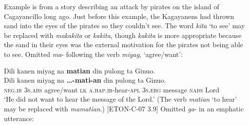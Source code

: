 Example  is from a story describing an attack by pirates on the island of Cagayancillo long ago. Just before this example, the Kagayanens had thrown sand into the eyes of the pirates so they couldn’t see. The word \textit{kita} ‘to see’ may be replaced with \textit{makakita} or \textit{kakita}, though \textit{kakita} is more appropriate because the sand in their eyes was the external motivation for the pirates not being able to see. 
\ea
Omitted \textit{ma}{}- following the verb \textit{miyag}, `agree/want': \\\smallskip

Dili  kanen  miyag  na  \textbf{matian}  din  pulong  ta  Ginuo. \\\smallskip
 \gll Dili  kanen  miyag  na  \textbf{…-mati-an}  din  pulong  ta  Ginuo. \\
\textsc{neg.ir}  3\textsc{s.abs}  agree/want  \textsc{lk}  \textsc{a.hap.}\textsc{ir}-hear-\textsc{apl}  3\textsc{s.erg}  message  \textsc{nabs}  Lord \\
\glt ‘He did not want to hear the message of the Lord.’ (The verb \textit{matian} ‘to hear’ may be replaced with \textit{mamatian}.) [ETON-C-07 3.9]
\z
\ea
Omitted \textit{ga}{}- in an emphatic utterance: \\\smallskip

